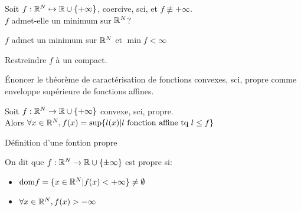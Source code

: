 \begin{note}
  \begin{field}
    Soit $f:\mathbb{R}^N \mapsto \mathbb{R} \cup \{+\infty\}$, coercive, sci, et
    $f\not\equiv +\infty$.\\
    $f$ admet-elle un minimum sur $\mathbb{R}^N$?
  \end{field}
  \begin{field}
    $f$ admet un minimum sur $\mathbb{R}^N$ et $\min f < \infty$
  \end{field}
  \begin{field}
    Restreindre $f$ à un compact.
  \end{field}
\end{note}

\begin{note}
  \begin{field}
    Énoncer le théorème de caractérisation de fonctions convexes, sci,
    propre comme enveloppe supérieure de fonctions affines.
  \end{field}
  \begin{field}
    Soit $f:\mathbb{R}^N\rightarrow\mathbb{R}\cup\{+\infty\}$ convexe, sci, propre.\\
    Alors $\forall x \in \mathbb{R}^N, f(x)=\sup\{l(x)|l \text{ fonction
      affine tq } l\leq f\}$
  \end{field}
  \begin{field}

  \end{field}
\end{note}

\begin{note}
  \begin{field}
    Définition d'une fontion propre
  \end{field}
  \begin{field}
    On dit que $f:\mathbb{R}^N\rightarrow\mathbb{R}\cup\{\pm\infty\}$ est propre si:
    \begin{itemize}
      \item $\mathop{}\!\mathrm{dom}{f} = \{x\in\mathbb{R}^N|f(x)<+\infty\} \neq \emptyset$
      \item $\forall x \in \mathbb{R}^N, f(x) > - \infty$
    \end{itemize}

  \end{field}
  \begin{field}

  \end{field}
\end{note}

